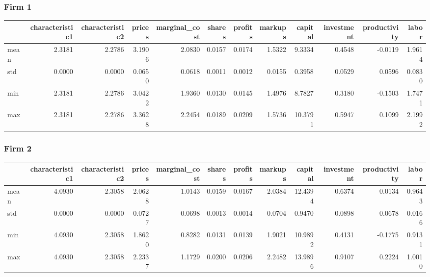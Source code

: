  \subsubsection*{Firm 1}
\begin{tabular}{lrrrrrrrrrrr}
\toprule
{} &  characteristic1 &  characteristic2 &  prices &  marginal\_cost &  shares &  profits &  markups &  capital &  investment &  productivity &  labor \\
\midrule
mean &           2.3181 &           2.2786 &  3.1906 &         2.0830 &  0.0157 &   0.0174 &   1.5322 &   9.3334 &      0.4548 &       -0.0119 & 1.9614 \\
std  &           0.0000 &           0.0000 &  0.0650 &         0.0618 &  0.0011 &   0.0012 &   0.0155 &   0.3958 &      0.0529 &        0.0596 & 0.0830 \\
min  &           2.3181 &           2.2786 &  3.0422 &         1.9360 &  0.0130 &   0.0145 &   1.4976 &   8.7827 &      0.3180 &       -0.1503 & 1.7471 \\
max  &           2.3181 &           2.2786 &  3.3628 &         2.2454 &  0.0189 &   0.0209 &   1.5736 &  10.3791 &      0.5947 &        0.1099 & 2.1992 \\
\bottomrule
\end{tabular}


 \subsubsection*{Firm 2}
\begin{tabular}{lrrrrrrrrrrr}
\toprule
{} &  characteristic1 &  characteristic2 &  prices &  marginal\_cost &  shares &  profits &  markups &  capital &  investment &  productivity &  labor \\
\midrule
mean &           4.0930 &           2.3058 &  2.0628 &         1.0143 &  0.0159 &   0.0167 &   2.0384 &  12.4394 &      0.6374 &        0.0134 & 0.9643 \\
std  &           0.0000 &           0.0000 &  0.0727 &         0.0698 &  0.0013 &   0.0014 &   0.0704 &   0.9470 &      0.0898 &        0.0678 & 0.0166 \\
min  &           4.0930 &           2.3058 &  1.8620 &         0.8282 &  0.0131 &   0.0139 &   1.9021 &  10.9892 &      0.4131 &       -0.1775 & 0.9131 \\
max  &           4.0930 &           2.3058 &  2.2337 &         1.1729 &  0.0200 &   0.0206 &   2.2482 &  13.9896 &      0.9107 &        0.2224 & 1.0010 \\
\bottomrule
\end{tabular}


